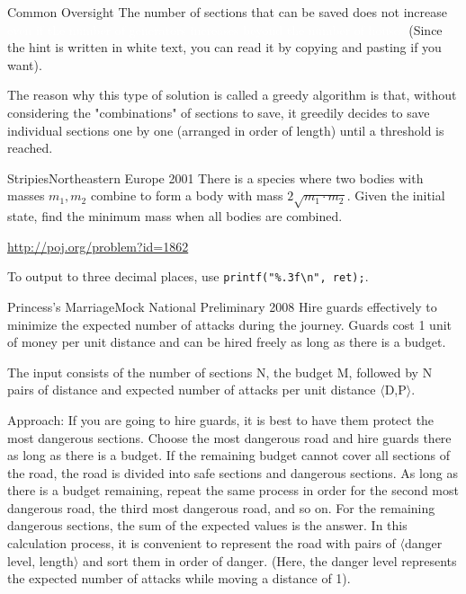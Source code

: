 \begin{debugbox}{Common Oversight}
The number of sections that can be saved does not increase \textcolor{white}{even if the number of generators increases beyond the number of houses} (Since the hint is written in white text, you can read it by copying and pasting if you want).
\end{debugbox}

The reason why this type of solution is called a greedy algorithm is that, without considering the "combinations" of sections to save, it greedily decides to save individual sections one by one (arranged in order of length) until a threshold is reached.

\begin{pbox}{Stripies}{Northeastern Europe 2001}
There is a species where two bodies with masses $m_1, m_2$ combine to form a body with mass $2\sqrt{m_1 \cdot m_2}$. Given the initial state, find the minimum mass when all bodies are combined.

\url{http://poj.org/problem?id=1862}
\end{pbox}

To output to three decimal places, use \texttt{printf("\%.3f\textbackslash{}n", ret);}.

\begin{pbox}{Princess's Marriage}{Mock National Preliminary 2008}
Hire guards effectively to minimize the expected number of attacks during the journey. Guards cost 1 unit of money per unit distance and can be hired freely as long as there is a budget.

The input consists of the number of sections N, the budget M, followed by N pairs of distance and expected number of attacks per unit distance $\langle$D,P$\rangle$.

\end{pbox}

Approach:
If you are going to hire guards, it is best to have them protect the most dangerous sections. Choose the most dangerous road and hire guards there as long as there is a budget. If the remaining budget cannot cover all sections of the road, the road is divided into safe sections and dangerous sections. As long as there is a budget remaining, repeat the same process in order for the second most dangerous road, the third most dangerous road, and so on. For the remaining dangerous sections, the sum of the expected values is the answer.
In this calculation process, it is convenient to represent the road with pairs of $\langle$danger level, length$\rangle$ and sort them in order of danger. (Here, the danger level represents the expected number of attacks while moving a distance of 1).

